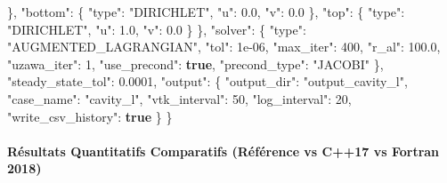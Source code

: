 \documentclass[
  10pt,
]{article}
\newenvironment{Shaded}{}{}
\newcommand{\DataTypeTok}[1]{\textcolor[rgb]{0.56,0.13,0.00}{#1}}
\newcommand{\DecValTok}[1]{\textcolor[rgb]{0.25,0.63,0.44}{#1}}
\newcommand{\FloatTok}[1]{\textcolor[rgb]{0.25,0.63,0.44}{#1}}
\newcommand{\FunctionTok}[1]{\textcolor[rgb]{0.02,0.16,0.49}{#1}}
\newcommand{\KeywordTok}[1]{\textcolor[rgb]{0.00,0.44,0.13}{\textbf{#1}}}
\newcommand{\StringTok}[1]{\textcolor[rgb]{0.25,0.44,0.63}{#1}}
\begin{document}
\begin{Shaded}
\begin{Highlighting}[]
    \FunctionTok{\},}
    \DataTypeTok{"bottom"}\FunctionTok{:} \FunctionTok{\{}
      \DataTypeTok{"type"}\FunctionTok{:} \StringTok{"DIRICHLET"}\FunctionTok{,}
      \DataTypeTok{"u"}\FunctionTok{:} \FloatTok{0.0}\FunctionTok{,}
      \DataTypeTok{"v"}\FunctionTok{:} \FloatTok{0.0}
    \FunctionTok{\},}
    \DataTypeTok{"top"}\FunctionTok{:} \FunctionTok{\{}
      \DataTypeTok{"type"}\FunctionTok{:} \StringTok{"DIRICHLET"}\FunctionTok{,}
      \DataTypeTok{"u"}\FunctionTok{:} \FloatTok{1.0}\FunctionTok{,}
      \DataTypeTok{"v"}\FunctionTok{:} \FloatTok{0.0}
    \FunctionTok{\}}
  \FunctionTok{\},}
  \DataTypeTok{"solver"}\FunctionTok{:} \FunctionTok{\{}
    \DataTypeTok{"type"}\FunctionTok{:} \StringTok{"AUGMENTED\_LAGRANGIAN"}\FunctionTok{,}
    \DataTypeTok{"tol"}\FunctionTok{:} \DecValTok{1e{-}06}\FunctionTok{,}
    \DataTypeTok{"max\_iter"}\FunctionTok{:} \DecValTok{400}\FunctionTok{,}
    \DataTypeTok{"r\_al"}\FunctionTok{:} \FloatTok{100.0}\FunctionTok{,}
    \DataTypeTok{"uzawa\_iter"}\FunctionTok{:} \DecValTok{1}\FunctionTok{,}
    \DataTypeTok{"use\_precond"}\FunctionTok{:} \KeywordTok{true}\FunctionTok{,}
    \DataTypeTok{"precond\_type"}\FunctionTok{:} \StringTok{"JACOBI"}
  \FunctionTok{\},}
  \DataTypeTok{"steady\_state\_tol"}\FunctionTok{:} \FloatTok{0.0001}\FunctionTok{,}
  \DataTypeTok{"output"}\FunctionTok{:} \FunctionTok{\{}
    \DataTypeTok{"output\_dir"}\FunctionTok{:} \StringTok{"output\_cavity\_l"}\FunctionTok{,}
    \DataTypeTok{"case\_name"}\FunctionTok{:} \StringTok{"cavity\_l"}\FunctionTok{,}
    \DataTypeTok{"vtk\_interval"}\FunctionTok{:} \DecValTok{50}\FunctionTok{,}
    \DataTypeTok{"log\_interval"}\FunctionTok{:} \DecValTok{20}\FunctionTok{,}
    \DataTypeTok{"write\_csv\_history"}\FunctionTok{:} \KeywordTok{true}
  \FunctionTok{\}}
\FunctionTok{\}}
\end{Highlighting}
\end{Shaded}

\paragraph{Résultats Quantitatifs Comparatifs (Référence vs C++17 vs
Fortran
2018)}\label{ruxe9sultats-quantitatifs-comparatifs-ruxe9fuxe9rence-vs-c17-vs-fortran-2018-8}
\end{document}
